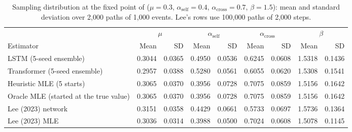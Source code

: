 \begin{table}[htbp]
\centering
\caption{Sampling distribution at the fixed point of \citet{lee2023} ($\mu=0.3$, $\alpha_{\mathrm{self}}=0.4$, $\alpha_{\mathrm{cross}}=0.7$, $\beta=1.5$): mean and standard deviation over 2,000 paths of 1,000 events. Lee's rows use 100,000 paths of 2,000 steps.}
\label{tab:e2-ponto-fixo}
\scriptsize
\begin{tabular}{lrrrrrrrr}
\toprule
 & \multicolumn{2}{c}{$\mu$} & \multicolumn{2}{c}{$\alpha_{\mathrm{self}}$} & \multicolumn{2}{c}{$\alpha_{\mathrm{cross}}$} & \multicolumn{2}{c}{$\beta$}\\
Estimator & Mean & SD & Mean & SD & Mean & SD & Mean & SD\\
\midrule
LSTM (5-seed ensemble) & 0.3044 & 0.0365 & 0.4950 & 0.0536 & 0.6245 & 0.0608 & 1.5318 & 0.1436\\
Transformer (5-seed ensemble) & 0.2957 & 0.0388 & 0.5280 & 0.0561 & 0.6055 & 0.0620 & 1.5308 & 0.1541\\
Heuristic MLE (5 starts) & 0.3065 & 0.0370 & 0.3956 & 0.0728 & 0.7075 & 0.0859 & 1.5156 & 0.1642\\
Oracle MLE (started at the true value) & 0.3065 & 0.0370 & 0.3956 & 0.0728 & 0.7075 & 0.0859 & 1.5156 & 0.1642\\
Lee (2023) network & 0.3151 & 0.0358 & 0.4429 & 0.0661 & 0.5733 & 0.0697 & 1.5736 & 0.1364\\
Lee (2023) MLE & 0.3036 & 0.0314 & 0.3988 & 0.0500 & 0.7024 & 0.0608 & 1.5078 & 0.1145\\
\bottomrule
\end{tabular}
\end{table}
